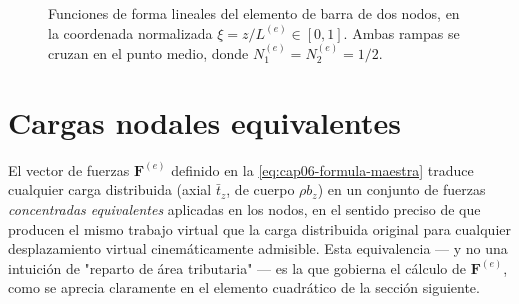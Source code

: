 \begin{figure}[htbp]
\centering
{}
\caption{Funciones de forma lineales del elemento de barra de dos nodos, en la coordenada normalizada $\xi=z/L^{(e)}\in[0,1]$. Ambas rampas se cruzan en el punto medio, donde $N_1^{(e)}=N_2^{(e)}=1/2$.}
\label{fig:cap06-funciones-forma-2nodos}
\end{figure}

\section{Cargas nodales equivalentes}
\label{sec:cap06-cargas-equivalentes}

El vector de fuerzas $\bm F^{(e)}$ definido en la \cref{eq:cap06-formula-maestra} traduce cualquier carga distribuida (axial $\bar t_z$, de cuerpo $\rho b_z$) en un conjunto de fuerzas \emph{concentradas equivalentes} aplicadas en los nodos, en el sentido preciso de que producen el mismo trabajo virtual que la carga distribuida original para cualquier desplazamiento virtual cinemáticamente admisible. Esta equivalencia --- y no una intuición de "reparto de área tributaria" --- es la que gobierna el cálculo de $\bm F^{(e)}$, como se aprecia claramente en el elemento cuadrático de la sección siguiente.

